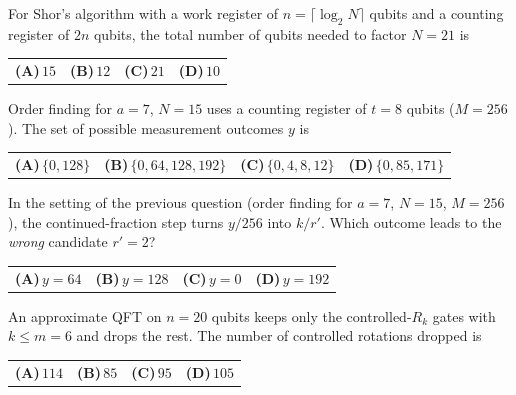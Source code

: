 \documentclass[11pt,a4paper]{article}
\newcommand{\optlabel}[1]{\textbf{(#1)}}
\newenvironment{qitem}[1]{\begin{list}{}{\setlength{\leftmargin}{3.3em}\setlength{\labelwidth}{3.1em}%
  \setlength{\labelsep}{0.2em}\setlength{\topsep}{3pt}\setlength{\parsep}{3pt}}\item[\textbf{Q.#1}\hfill]}{\end{list}}
\newcommand{\qsep}{\par\vspace{2pt}{\color{black!15}\hrule}\vspace{4pt}}
\begin{document}
\begin{qitem}{68}
For Shor's algorithm with a work register of $n = \lceil\log_2 N\rceil$ qubits and a counting register of $2n$ qubits,
the total number of qubits needed to factor $N = 21$ is
\par\smallskip\noindent\begin{tabularx}{\linewidth}{@{}*{4}{L}@{}}
\optlabel{A}\,$15$ & \optlabel{B}\,$12$ & \optlabel{C}\,$21$ & \optlabel{D}\,$10$
\end{tabularx}
\end{qitem}
\qsep

\begin{qitem}{69}
Order finding for $a = 7$, $N = 15$ uses a counting register of $t = 8$ qubits ($M = 256$). The set of possible
measurement outcomes $y$ is
\par\smallskip\noindent\begin{tabularx}{\linewidth}{@{}*{4}{L}@{}}
\optlabel{A}\,$\{0, 128\}$ & \optlabel{B}\,$\{0, 64, 128, 192\}$ & \optlabel{C}\,$\{0, 4, 8, 12\}$ & \optlabel{D}\,$\{0, 85, 171\}$
\end{tabularx}
\end{qitem}
\qsep

\begin{qitem}{70}
In the setting of the previous question (order finding for $a = 7$, $N = 15$, $M = 256$), the continued-fraction step
turns $y/256$ into $k/r'$. Which outcome leads to the \emph{wrong} candidate $r' = 2$?
\par\smallskip\noindent\begin{tabularx}{\linewidth}{@{}*{4}{L}@{}}
\optlabel{A}\,$y = 64$ & \optlabel{B}\,$y = 128$ & \optlabel{C}\,$y = 0$ & \optlabel{D}\,$y = 192$
\end{tabularx}
\end{qitem}
\qsep

\begin{qitem}{71}
An approximate QFT on $n = 20$ qubits keeps only the controlled-$R_k$ gates with $k \le m = 6$ and drops the rest.
The number of controlled rotations dropped is
\par\smallskip\noindent\begin{tabularx}{\linewidth}{@{}*{4}{L}@{}}
\optlabel{A}\,$114$ & \optlabel{B}\,$85$ & \optlabel{C}\,$95$ & \optlabel{D}\,$105$
\end{tabularx}
\end{qitem}
\qsep
\end{document}
